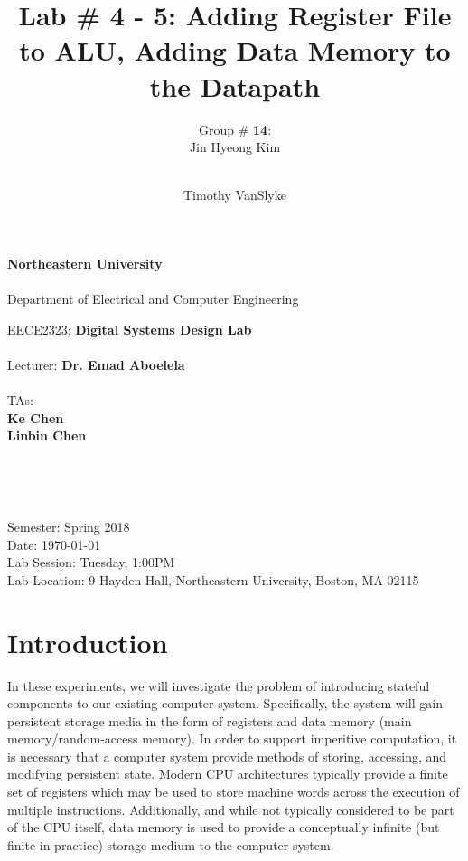 \documentclass[12pt, letterpaper]{article}
\title{Lab \# 4 - 5: \textbf{Adding Register File to ALU, Adding Data Memory to the Datapath}}
\author{Group \# \textbf{14}:\\ Jin Hyeong Kim \and\\ Timothy VanSlyke}
\begin{document}
\begin{titlepage}
	\begin{center}
		{\Large
			\textbf{Northeastern University}\\
			~\\
			Department of Electrical and Computer Engineering\\ 
		}

		\vfill

		{\large
			EECE2323: \textbf{Digital Systems Design Lab}\\
			~\\
			Lecturer: \textbf{Dr. Emad Aboelela}\\
			~\\
			TAs:\\
			\textbf{Ke Chen}\\
			\textbf{Linbin Chen}\\
		}
	
		\vfill

		{\Large \thetitle}\\
	
		\vfill

		{\large \theauthor}\\

		\vfill

		{\large
			Semester: Spring 2018\\
			Date: \today\\
			Lab Session: Tuesday, 1:00PM\\ 
			Lab Location: 9 Hayden Hall, Northeastern University, Boston, MA 02115\\
		}

	\end{center}
\end{titlepage}

\tableofcontents


\newpage
\section{Introduction}
In these experiments, we will investigate the problem of introducing stateful components to our existing computer system.  Specifically, the system will gain persistent storage media in the form of registers and data memory (main memory/random-access memory).  In order to support imperitive computation, it is necessary that a computer system provide methods of storing, accessing, and modifying persistent state.  Modern CPU architectures typically provide a finite set of registers which may be used to store machine words across the execution of multiple instructions.  Additionally, and while not typically considered to be part of the CPU itself, data memory is used to provide a conceptually infinite (but finite in practice) storage medium to the computer system.  
\end{document}
